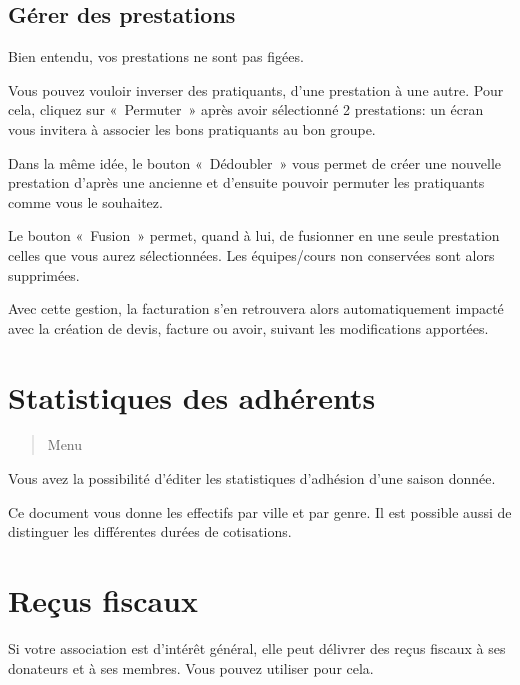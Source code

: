 \documentclass[a4paper,10pt,oneside,french]{sphinxmanual}
\begin{document}
\subsection{Gérer des prestations}
\label{\detokenize{member/prestation:gerer-des-prestations}}
\sphinxAtStartPar
Bien entendu, vos prestations ne sont pas figées.

\sphinxAtStartPar
Vous pouvez vouloir inverser des pratiquants, d’une prestation à une autre.
Pour cela, cliquez sur « Permuter » après avoir sélectionné 2 prestations: un écran vous invitera à associer les bons pratiquants au bon groupe.
\begin{quote}

\noindent{}
\end{quote}

\sphinxAtStartPar
Dans la même idée, le bouton « Dédoubler » vous permet de créer une nouvelle prestation d’après une ancienne et d’ensuite pouvoir permuter les pratiquants comme vous le souhaitez.

\sphinxAtStartPar
Le bouton « Fusion » permet, quand à lui, de fusionner en une seule prestation celles que vous aurez sélectionnées.
Les équipes/cours non conservées sont alors supprimées.

\sphinxAtStartPar
Avec cette gestion, la facturation s’en retrouvera alors automatiquement impacté avec la création de devis, facture ou avoir, suivant les modifications apportées.


\section{Statistiques des adhérents}
\label{\detokenize{member/statistic:statistiques-des-adherents}}\label{\detokenize{member/statistic::doc}}\begin{quote}

\sphinxAtStartPar
Menu 
\end{quote}

\noindent{}

\sphinxAtStartPar
Vous avez la possibilité d’éditer les statistiques d’adhésion d’une saison donnée.

\sphinxAtStartPar
Ce document vous donne les effectifs par ville et par genre. Il est possible aussi de distinguer les différentes durées de cotisations.


\section{Reçus fiscaux}
\label{\detokenize{member/taxreceipt:recus-fiscaux}}\label{\detokenize{member/taxreceipt::doc}}
\sphinxAtStartPar
Si votre association est d’intérêt général, elle peut délivrer des reçus fiscaux à ses donateurs et à ses membres. Vous pouvez utiliser  pour cela.
\end{document}

